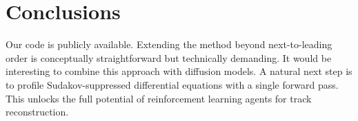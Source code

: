 \section{Conclusions}\label{sec:conclusions}

Our code is publicly available. Extending the method beyond
next-to-leading order is conceptually straightforward but technically
demanding. It would be interesting to combine this approach with
diffusion models. A natural next step is to profile Sudakov-suppressed
differential equations with a single forward pass. This unlocks the full
potential of reinforcement learning agents for track reconstruction.

